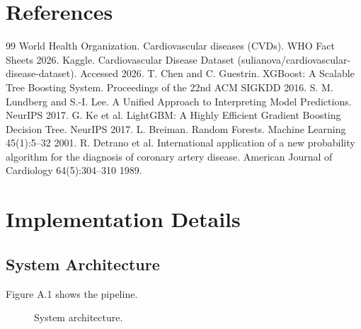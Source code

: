 \documentclass[11pt, a4paper, oneside]{book}
\begin{document}
\chapter*{References}
\begin{thebibliography}{99}
 World Health Organization. Cardiovascular diseases (CVDs). WHO Fact Sheets 2026.
 Kaggle. Cardiovascular Disease Dataset (sulianova/cardiovascular-disease-dataset). Accessed 2026.
 T. Chen and C. Guestrin. XGBoost: A Scalable Tree Boosting System. Proceedings of the 22nd ACM SIGKDD 2016.
 S. M. Lundberg and S.-I. Lee. A Unified Approach to Interpreting Model Predictions. NeurIPS 2017.
 G. Ke et al. LightGBM: A Highly Efficient Gradient Boosting Decision Tree. NeurIPS 2017.
 L. Breiman. Random Forests. Machine Learning 45(1):5–32 2001.
 R. Detrano et al. International application of a new probability algorithm for the diagnosis of coronary artery disease. American Journal of Cardiology 64(5):304–310 1989.
\end{thebibliography}

\appendix
\chapter{Implementation Details}

\section{System Architecture}
Figure A.1 shows the pipeline.

\begin{figure}[htbp]
\centering
{}
\caption{System architecture.}
\label{fig:system_arch}
\end{figure}
\end{document}
